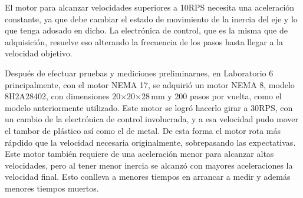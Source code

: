 El motor para alcanzar velocidades superiores a 10RPS necesita una aceleración constante, ya que debe cambiar el estado de movimiento de la inercia del eje y lo que tenga adosado en dicho. La electrónica de control, que es la misma que de adquisición, resuelve eso alterando la frecuencia de los pasos hasta llegar a la velocidad objetivo.

Después de efectuar pruebas y mediciones preliminarnes, en Laboratorio 6 principalmente, con el motor NEMA 17, se adquirió un motor NEMA 8, modelo 8H2A28402, con dimensiones 20$\times$20$\times$28$\,$mm y 200 pasos por vuelta, como el modelo anteriormente utilizado. Este motor se logró hacerlo girar a 30RPS, con un cambio de la electrónica de control involucrada, y a esa velocidad pudo mover el tambor de plástico así como el de metal. De esta forma el motor rota más rápdido que la velocidad necesaria originalmente, sobrepasando las expectativas. Este motor también requiere de una aceleración menor para alcanzar altas velocidades, pero al tener menor inercia se alcanzó con mayores aceleraciones la velocidad final. Esto conlleva a menores tiempos en arrancar a medir y además menores tiempos muertos.

